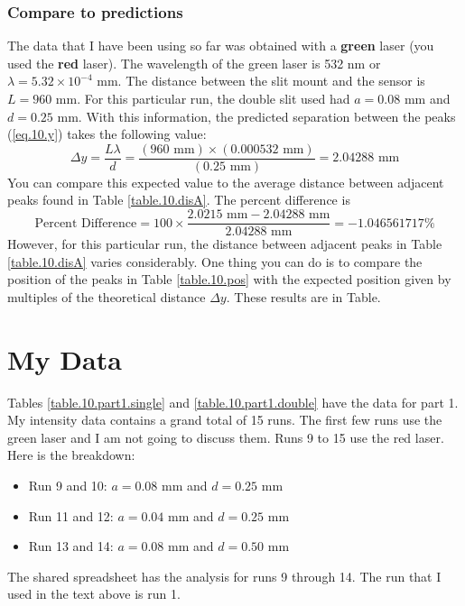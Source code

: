 \subsubsection{Compare to predictions}
The data that I have been using so far was obtained with a \textbf{green} laser (you used the \textbf{red} laser). The wavelength of the green laser is 532 nm or $\lambda = 5.32 \times 10^{-4}$ mm. The distance between the slit mount and the sensor is $L = 960$ mm. For this particular run, the double slit used had $a = 0.08$ mm and $d = 0.25$ mm. With this information, the predicted separation between the peaks (\ref{eq.10.y}) takes the following value:
\begin{equation}
	\Delta y = \frac{L \lambda}{d} = \frac{(960 \text{ mm}) \times (0.000532 \text{ mm})}{(0.25 \text{ mm})} = 2.04288 \text{ mm}
\end{equation}
You can compare this expected value to the average distance between adjacent peaks found in Table \ref{table.10.disA}. The percent difference is
\begin{equation}
	\text{Percent Difference} = 100 \times \frac{2.0215 \text{ mm} - 2.04288 \text{ mm}}{2.04288 \text{ mm}} = -1.046561717 \%
\end{equation}
However, for this particular run, the distance between adjacent peaks in Table \ref{table.10.disA} varies considerably. One thing you can do is to compare the position of the peaks in Table \ref{table.10.pos} with the expected position given by multiples of the theoretical distance $\Delta y$. These results are in Table.
\section{My Data}
Tables \ref{table.10.part1.single} and \ref{table.10.part1.double} have the data for part 1. My intensity data contains a grand total of 15 runs. The first few runs use the green laser and I am not going to discuss them. Runs 9 to 15 use the red laser. Here is the breakdown:
\begin{itemize}
	\item Run 9 and 10: $a = 0.08$ mm and $d = 0.25$ mm
	\item Run 11 and 12: $a = 0.04$ mm and $d = 0.25$ mm
	\item Run 13 and 14: $a = 0.08$ mm and $d = 0.50$ mm
\end{itemize}
The shared spreadsheet has the analysis for runs 9 through 14. The run that I used in the text above is run 1.
